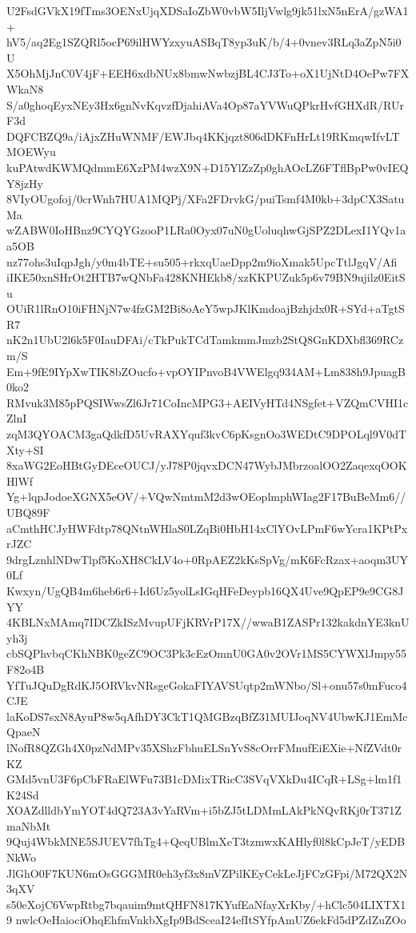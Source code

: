 U2FsdGVkX19fTms3OENxUjqXDSaIoZbW0vbW5IljVwlg9jk51lxN5nErA/gzWA1+
hV5/aq2Eg1SZQRl5ocP69ilHWYzxyuASBqT8yp3uK/b/4+0vnev3RLq3aZpN5i0U
X5OhMjJnC0V4jF+EEH6xdbNUx8bmwNwbzjBL4CJ3To+oX1UjNtD4OePw7FXWkaN8
S/a0ghoqEyxNEy3Hx6gnNvKqvzfDjahiAVa4Op87aYVWuQPkrHvfGHXdR/RUrF3d
DQFCBZQ9a/iAjxZHuWNMF/EWJbq4KKjqzt806dDKFnHrLt19RKmqwIfvLTMOEWyu
kuPAtwdKWMQdmmE6XzPM4wzX9N+D15YlZzZp0ghAOcLZ6FTflBpPw0vIEQY8jzHy
8VIyOUgofoj/0crWnh7HUA1MQPj/XFa2FDrvkG/puiTsmf4M0kb+3dpCX3SatuMa
wZABW0IoHBnz9CYQYGzooP1LRa0Oyx07uN0gUoluqhwGjSPZ2DLexI1YQv1aa5OB
nz77ohs3uIqpJgh/y0m4bTE+su505+rkxqUaeDpp2m9ioXmak5UpcTtlJgqV/Afi
iIKE50xnSHrOt2HTB7wQNbFa428KNHEkb8/xzKKPUZuk5p6v79BN9ujilz0EitSu
OUiR1lRnO10iFHNjN7w4fzGM2Bi8oAeY5wpJKlKmdoajBzhjdx0R+SYd+aTgtSR7
nK2n1UbU2l6k5F0IauDFAi/cTkPukTCdTamkmmJmzb2StQ8GnKDXbfl369RCzm/S
Em+9fE9IYpXwTIK8bZOucfo+vpOYIPnvoB4VWElgq934AM+Lm838h9JpuagB0ko2
RMvuk3M85pPQSIWwsZl6Jr71CoIncMPG3+AEIVyHTd4NSgfet+VZQmCVHI1cZlnI
zqM3QYOACM3gaQdkfD5UvRAXYquf3kvC6pKsgnOo3WEDtC9DPOLql9V0dTXty+SI
8xaWG2EoHBtGyDEceOUCJ/yJ78P0jqvxDCN47WybJMbrzoalOO2ZaqexqOOKHlWf
Yg+lqpJodoeXGNX5eOV/+VQwNmtmM2d3wOEoplmphWIag2F17BuBeMm6//UBQ89F
aCmthHCJyHWFdtp78QNtnWHlaS0LZqBi0HbH14xClYOvLPmF6wYcra1KPtPxrJZC
9drgLznhlNDwTlpf5KoXH8CkLV4o+0RpAEZ2kKsSpVg/mK6FcRzax+aoqm3UY0Lf
Kwxyn/UgQB4m6heb6r6+Id6Uz5yolLsIGqHFeDeypb16QX4Uve9QpEP9e9CG8JYY
4KBLNxMAmq7IDCZkISzMvupUFjKRVrP17X//wwaB1ZASPr132kakdnYE3knUyh3j
cbSQPhvbqCKhNBK0geZC9OC3Pk3cEzOmnU0GA0v2OVr1MS5CYWXlJmpy55F82o4B
YfTuJQuDgRdKJ5ORVkvNRsgeGokaFIYAVSUqtp2mWNbo/Sl+onu57s0mFuco4CJE
laKoDS7sxN8AyuP8w5qAfhDY3CkT1QMGBzqBfZ31MUIJoqNV4UbwKJ1EmMcQpaeN
lNofR8QZGh4X0pzNdMPv35XShzFbhuELSnYvS8cOrrFMnufEiEXie+NfZVdt0rKZ
GMd5vnU3F6pCbFRaElWFu73B1cDMixTRicC3SVqVXkDu4ICqR+LSg+lm1f1K24Sd
XOAZdlldbYmYOT4dQ723A3vYaRVm+i5bZJ5tLDMmLAkPkNQvRKj0rT371ZmaNbMt
9Quj4WbkMNE5SJUEV7fhTg4+QeqUBlmXeT3tzmwxKAHlyf0l8kCpJeT/yEDBNkWo
JlGhO0F7KUN6mOsGGGMR0eh3yf3x8mVZPilKEyCekLeJjFCzGFpi/M72QX2N3qXV
s50eXojC6VwpRtbg7bqauim9mtQHFN817KYufEaNfayXrKby/+hClc504LIXTX19
nwlcOeHaiociOhqEhfmVnkbXgIp9BdSceaI24efItSYfpAmUZ6ekFd5dPZdZuZOo
